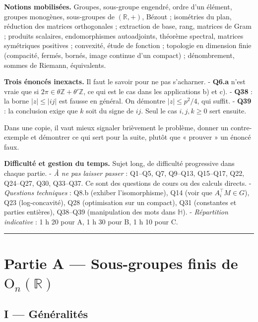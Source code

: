 \documentclass[11pt,a4paper]{article}
\begin{document}
\textbf{Notions mobilisées.} Groupes, sous-groupe engendré, ordre d'un élément, groupes monogènes, sous-groupes de \((\mathbb{R},+)\), Bézout ; isométries du plan, réduction des matrices orthogonales ; extraction de base, rang, matrices de Gram ; produits scalaires, endomorphismes autoadjoints, théorème spectral, matrices symétriques positives ; convexité, étude de fonction ; topologie en dimension finie (compacité, fermés, bornés, image continue d'un compact) ; dénombrement, sommes de Riemann, équivalents.

\textbf{Trois énoncés inexacts.} Il faut le savoir pour ne pas s'acharner.
- \textbf{Q6.a} n'est vraie que si \(2\pi\in\theta\mathbb{Z}+\theta'\mathbb{Z}\), ce qui est le cas dans les applications b) et c).
- \textbf{Q38} : la borne \(|z|\leqslant|ij|\) est fausse en général. On démontre \(|z|\leqslant p^2/4\), qui suffit.
- \textbf{Q39} : la conclusion exige que \(k\) soit du signe de \(ij\). Seul le cas \(i,j,k\geqslant0\) sert ensuite.

Dans une copie, il vaut mieux signaler brièvement le problème, donner un contre-exemple et démontrer ce qui sert pour la suite, plutôt que « prouver » un énoncé faux.

\textbf{Difficulté et gestion du temps.} Sujet long, de difficulté progressive dans chaque partie.
- \emph{À ne pas laisser passer} : Q1--Q5, Q7, Q9--Q13, Q15--Q17, Q22, Q24--Q27, Q30, Q33--Q37. Ce sont des questions de cours ou des calculs directs.
- \emph{Questions techniques} : Q8.b (exhiber l'isomorphisme), Q14 (voir que \(A_i^\top M\in G\)), Q23 (log-concavité), Q28 (optimisation sur un compact), Q31 (constantes et parties entières), Q38--Q39 (manipulation des mots dans \(\mathbb{H}\)).
- \emph{Répartition indicative} : 1 h 20 pour A, 1 h 30 pour B, 1 h 10 pour C.

\begin{center}\rule{0.5\linewidth}{0.5pt}\end{center}

\hypertarget{partie-a-sous-groupes-finis-de-mathrmo_nmathbbr}{%
\section{\texorpdfstring{Partie A --- Sous-groupes finis de \({\mathrm{O}}_n(\mathbb{R})\)}{Partie A --- Sous-groupes finis de \{\textbackslash mathrm\{O\}\}\_n(\textbackslash mathbb\{R\})}}\label{partie-a-sous-groupes-finis-de-mathrmo_nmathbbr}}

\hypertarget{i-guxe9nuxe9ralituxe9s}{%
\subsection{I --- Généralités}\label{i-guxe9nuxe9ralituxe9s}}
\end{document}
